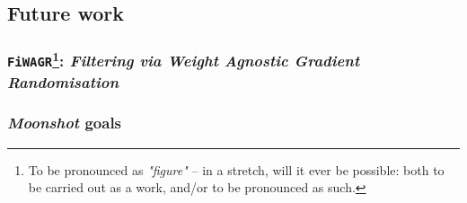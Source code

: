 

\subsection{Future work}

\subsubsection[\texttt{FiWAGR}: \textit{Filtering via Weight Agnostic Gradient Randomisation}]{\texttt{FiWAGR}\protect\footnote{To be pronounced as \textit{"figure"} -- in a stretch, will it ever be possible: both to be carried out as a work, and/or to be pronounced as such.}: \textit{Filtering via Weight Agnostic Gradient Randomisation}}

\subsubsection{\textit{Moonshot} goals}